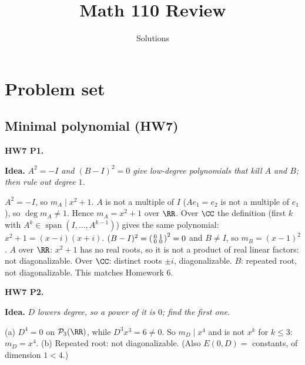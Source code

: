 \documentclass[10pt]{scrartcl}
\title{Math 110 Review}
\subtitle{Solutions}
\author{}
\date{}
\DeclareMathOperator{\spn}{span}
\newcommand{\PP}{\mathcal P}
\newcommand{\idea}[1]{{\color{OliveGreen!75!black}\textbf{Idea.}} \textit{#1}\par}
\newenvironment{prob}{\par\medskip\noindent\begin{minipage}{\linewidth}\setlength{\parskip}{3pt}}{\end{minipage}\par}
\begin{document}
\maketitle
\setcounter{section}{1}

\section{Problem set}

\subsection{Minimal polynomial (HW7)}

\begin{prob}
\textbf{HW7 P1. }\par 
\idea{$A^2=-I$ and $(B-I)^2=0$ give low-degree polynomials that kill $A$ and $B$; then rule out degree $1$.}
\begin{enumerate}[(a)]
  \ii $A^2=-I$, so $m_A\mid x^2+1$. $A$ is not a multiple of $I$ ($Ae_1=e_2$ is not a multiple of $e_1$), so $\deg m_A\ne1$. Hence $m_A=x^2+1$ over $\RR$. Over $\CC$ the definition (first $k$ with $A^k\in\spn(I,\dots,A^{k-1})$) gives the same polynomial: $x^2+1=(x-i)(x+i)$.
  \ii $(B-I)^2=\begin{psmallmatrix}0&1\\0&0\end{psmallmatrix}^2=0$ and $B\ne I$, so $m_B=(x-1)^2$.
  \ii $A$ over $\RR$: $x^2+1$ has no real roots, so it is not a product of real linear factors: not diagonalizable. Over $\CC$: distinct roots $\pm i$, diagonalizable. $B$: repeated root, not diagonalizable. This matches Homework 6.
\end{enumerate}
\end{prob}

\begin{prob}
\textbf{HW7 P2. }\par 
\idea{$D$ lowers degree, so a power of it is $0$; find the first one.}
(a) $D^4=0$ on $\PP_3(\RR)$, while $D^3x^3=6\ne0$. So $m_D\mid x^4$ and is not $x^k$ for $k\le3$: $m_D=x^4$. (b) Repeated root: not diagonalizable. (Also $E(0,D)=$ constants, of dimension $1<4$.)
\end{prob}
\end{document}
